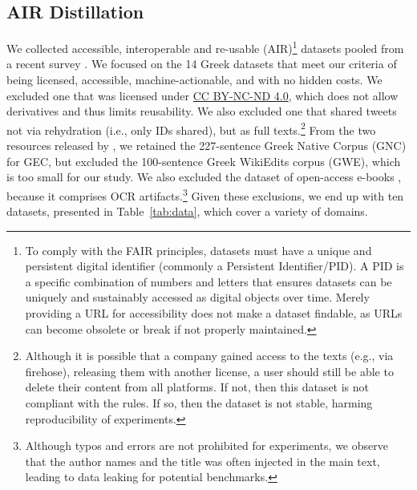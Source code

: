 \documentclass[sigconf,review,anonymous]{acmart}
\begin{document}
\subsection{AIR Distillation} 
We collected accessible, interoperable and re-usable (AIR)\footnote{To comply with the FAIR principles, datasets must have a unique and persistent digital identifier (commonly a Persistent Identifier/PID). A PID is a specific combination of numbers and letters that ensures datasets can be uniquely and sustainably accessed as digital objects over time. Merely providing a URL for accessibility does not make a dataset findable, as URLs can become obsolete or break if not properly maintained.} datasets pooled from a recent survey \cite{bakagianni2025systematic}. We focused on the 14 Greek datasets that meet our criteria of being licensed, accessible, machine-actionable, and with no hidden costs. We excluded one \cite{fitsilis2021development} that was licensed under \href{https://creativecommons.org/licenses/by-nc-nd/4.0/deed.en}{CC BY-NC-ND 4.0}, which does not allow derivatives and thus limits reusability. We also excluded one \cite{Zampieri2020} that shared tweets not via rehydration (i.e., only IDs shared), but as full texts.\footnote{Although it is possible that a company gained access to the texts (e.g., via firehose), releasing them with another license, a user should still be able to delete their content from all platforms. If not, then this dataset is not compliant with the rules. If so, then the dataset is not stable, harming reproducibility of experiments.} From the two resources released by \citet{korre2021elerrant}, we retained the 227-sentence Greek Native Corpus (GNC) for GEC, but excluded the 100-sentence Greek WikiEdits corpus (GWE), which is too small for our study. We also excluded the dataset of open-access e-books \cite{Barzokas2020}, because it comprises OCR artifacts.\footnote{Although typos and errors are not prohibited for experiments, we observe that the author names and the title was often injected in the main text, leading to data leaking for potential benchmarks.} Given these exclusions, we end up with ten datasets, presented in Table~\ref{tab:data}, which cover a variety of domains.
\end{document}
